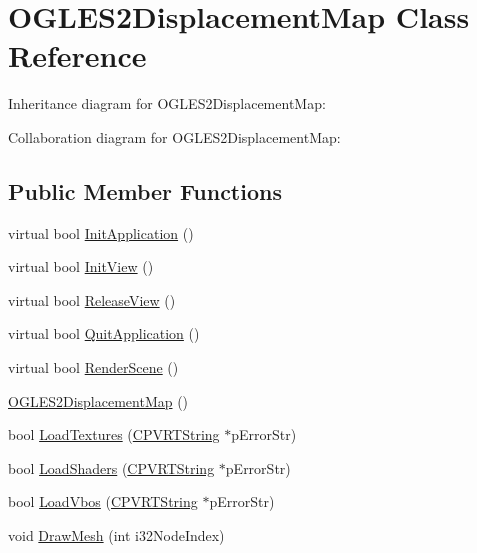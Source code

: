 \hypertarget{class_o_g_l_e_s2_displacement_map}{\section{O\+G\+L\+E\+S2\+Displacement\+Map Class Reference}
\label{class_o_g_l_e_s2_displacement_map}
}


Inheritance diagram for O\+G\+L\+E\+S2\+Displacement\+Map\+:


Collaboration diagram for O\+G\+L\+E\+S2\+Displacement\+Map\+:
\subsection*{Public Member Functions}
\begin{DoxyCompactItemize}
\item 
virtual bool \hyperlink{class_o_g_l_e_s2_displacement_map_a07c590875e740eb4e4a35e979477fbc2}{Init\+Application} ()
\item 
virtual bool \hyperlink{class_o_g_l_e_s2_displacement_map_a8234a56461c3ade780e4454b060d8cdc}{Init\+View} ()
\item 
virtual bool \hyperlink{class_o_g_l_e_s2_displacement_map_a2b5e44da91857fa67494a3a859869918}{Release\+View} ()
\item 
virtual bool \hyperlink{class_o_g_l_e_s2_displacement_map_a94ce2ba3736cbcb67f4413317d3e65f4}{Quit\+Application} ()
\item 
virtual bool \hyperlink{class_o_g_l_e_s2_displacement_map_a32ad71c4b07fbc0bbbb802c14acd0c11}{Render\+Scene} ()
\item 
\hyperlink{class_o_g_l_e_s2_displacement_map_a3d5e512b95a64afc907cd31fae533807}{O\+G\+L\+E\+S2\+Displacement\+Map} ()
\item 
bool \hyperlink{class_o_g_l_e_s2_displacement_map_a41c1cddcfdd510ddedd7a4ac60e7916a}{Load\+Textures} (\hyperlink{class_c_p_v_r_t_string}{C\+P\+V\+R\+T\+String} $\ast$p\+Error\+Str)
\item 
bool \hyperlink{class_o_g_l_e_s2_displacement_map_a83439a20999c4077e46ca4376e2175a4}{Load\+Shaders} (\hyperlink{class_c_p_v_r_t_string}{C\+P\+V\+R\+T\+String} $\ast$p\+Error\+Str)
\item 
bool \hyperlink{class_o_g_l_e_s2_displacement_map_afed9b58ad7d9e493e7de73208a1644ea}{Load\+Vbos} (\hyperlink{class_c_p_v_r_t_string}{C\+P\+V\+R\+T\+String} $\ast$p\+Error\+Str)
\item 
void \hyperlink{class_o_g_l_e_s2_displacement_map_ac08612b76d9c368bc83474cb0787d46e}{Draw\+Mesh} (int i32\+Node\+Index)
\end{DoxyCompactItemize}



